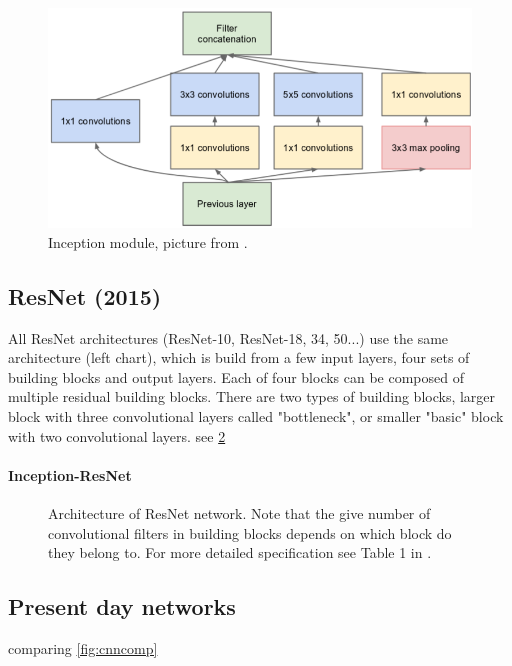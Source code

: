 \begin{figure}
    \includegraphics[width=\textwidth]{img/inception}
    \caption{Inception module, picture from \cite[figure 2]{bib:googlenet}.}
    \label{fig:incept_mod}
\end{figure}

\subsection*{ResNet (2015)}
\label{sec:resnet}

All ResNet \cite{bib:resnet} architectures (ResNet-10, ResNet-18, 34, 50...) use the same architecture (left chart), which is build from a few input layers, four sets of building blocks and output layers. Each of four blocks can be composed of multiple residual building blocks. There are two types of building blocks, larger block with three convolutional layers called "bottleneck", or smaller "basic" block with two convolutional layers.  see \cref{fig:resnet_arch}

\paragraph{Inception-ResNet}

\begin{figure}
    \resnetArch
    \caption{Architecture of ResNet network.
    Note that the give number of convolutional filters in building blocks depends on which block do they belong to. For more detailed specification see Table 1 in  \cite{bib:resnet}.}
    \label{fig:resnet_arch}
\end{figure}

\subsection*{Present day networks}
 comparing \cref{fig:cnncomp}

